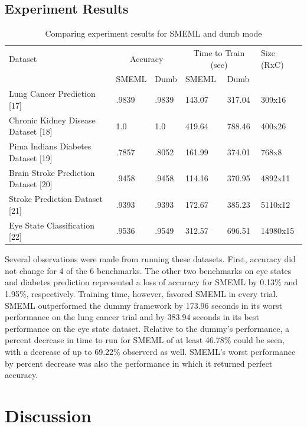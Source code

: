 \documentclass{article}
\begin{document}
\subsection{Experiment Results}
\begin{table}
  \caption{Comparing experiment results for SMEML and dumb mode}
  \label{model-options-table}
  \centering
  \begin{tabular}{llllll}
    \toprule
    Dataset & \multicolumn{2}{c}{Accuracy} & \multicolumn{2}{c}{Time to Train (sec)} & Size (RxC)\\
    \cmidrule(lr){2-3} \cmidrule(lr){4-5}
    & SMEML & Dumb & SMEML & Dumb \\
    \midrule
    Lung Cancer Prediction [17] & .9839 & .9839 & 143.07 & 317.04 & 309x16\\
    Chronic Kidney Disease Dataset [18] & 1.0 & 1.0 & 419.64 & 788.46 & 400x26\\
    Pima Indians Diabetes Dataset [19] & .7857 & .8052 & 161.99 & 374.01 & 768x8 \\
    Brain Stroke Prediction Dataset [20] & .9458 & .9458 & 114.16 & 370.95 & 4892x11\\
    Stroke Prediction Dataset [21] & .9393 & .9393 & 172.67 & 385.23 & 5110x12 \\
    Eye State Classification [22] & .9536 & .9549 & 312.57 & 696.51 & 14980x15\\ 
    \bottomrule
  \end{tabular}
\end{table}

Several observations were made from running these datasets. First, accuracy did not change for 4 of the 6 benchmarks. The other two benchmarks on eye states and diabetes prediction represented a loss of accuracy for SMEML by 0.13\% and 1.95\%, respectively. Training time, however, favored SMEML in every trial. SMEML outperformed the dummy framework by 173.96 seconds in its worst performance on the lung cancer trial and by 383.94 seconds in its best performance on the eye state dataset. Relative to the dummy's performance, a percent decrease in time to run for SMEML of at least 46.78\% could be seen, with a decrease of up to 69.22\% observerd as well. SMEML's worst performance by percent decrease was also the performance in which it returned perfect accuracy. 
\section{Discussion}
\end{document}
